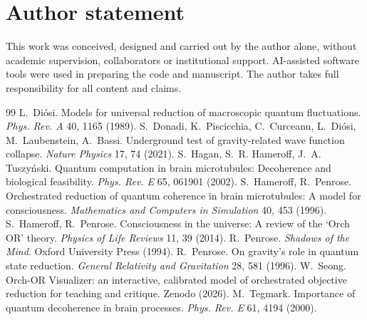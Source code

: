 \documentclass[11pt]{article}
\begin{document}
\section*{Author statement}
This work was conceived, designed and carried out by the author alone, without academic supervision, collaborators or institutional support. AI-assisted software tools were used in preparing the code and manuscript. The author takes full responsibility for all content and claims.

\begin{thebibliography}{99}
 L.~Di\'osi. Models for universal reduction of macroscopic quantum fluctuations. \emph{Phys. Rev. A} 40, 1165 (1989).
 S.~Donadi, K.~Piscicchia, C.~Curceanu, L.~Di\'osi, M.~Laubenstein, A.~Bassi. Underground test of gravity-related wave function collapse. \emph{Nature Physics} 17, 74 (2021).
 S.~Hagan, S.~R. Hameroff, J.~A. Tuszy\'nski. Quantum computation in brain microtubules: Decoherence and biological feasibility. \emph{Phys. Rev. E} 65, 061901 (2002).
 S.~Hameroff, R.~Penrose. Orchestrated reduction of quantum coherence in brain microtubules: A model for consciousness. \emph{Mathematics and Computers in Simulation} 40, 453 (1996).
 S.~Hameroff, R.~Penrose. Consciousness in the universe: A review of the `Orch OR' theory. \emph{Physics of Life Reviews} 11, 39 (2014).
 R.~Penrose. \emph{Shadows of the Mind}. Oxford University Press (1994).
 R.~Penrose. On gravity's role in quantum state reduction. \emph{General Relativity and Gravitation} 28, 581 (1996).
 W.~Seong. Orch-OR Visualizer: an interactive, calibrated model of orchestrated objective reduction for teaching and critique. Zenodo (2026). 
 M.~Tegmark. Importance of quantum decoherence in brain processes. \emph{Phys. Rev. E} 61, 4194 (2000).
\end{thebibliography}
\end{document}
